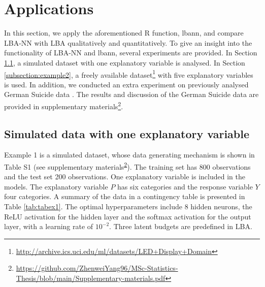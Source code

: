 \documentclass[]{interact}
\theoremstyle{plain}%
\theoremstyle{definition}
\theoremstyle{remark}
\begin{document}
\hypertarget{sec:app}{%
\section{Applications}\label{sec:app}}

In this section, we apply the aforementioned R function, \textsf{lbann},
and compare LBA-NN with LBA qualitatively and quantitatively. To give an
insight into the functionality of LBA-NN and \textsf{lbann}, several
experiments are provided. In Section \ref{subsection:example1}, a
simulated dataset with one explanatory variable is analysed. In Section
\ref{subsection:example2}, a freely available
dataset\footnote{\label{footnote:led} \url{http://archive.ics.uci.edu/ml/datasets/LED+Display+Domain}}
with five explanatory variables is used. In addition, we conducted an
extra experiment on previously analysed German Suicide data
\citep{Heijden1992}. The results and discussion of the German Suicide
data are provided in supplementary
materials\footnote{\label{footnote:suppl} \url{https://github.com/ZhenweiYang96/MSc-Statistics-Thesis/blob/main/Supplementary-materials.pdf}}.

\hypertarget{subsection:example1}{%
\subsection{Simulated data with one explanatory
variable}\label{subsection:example1}}

Example 1 is a simulated dataset, whose data generating mechanism is
shown in Table S1 (see supplementary
materials\textsuperscript{\ref{footnote:suppl}}). The training set has
800 observations and the test set 200 observations. One explanatory
variable is included in the models. The explanatory variable \(P\) has
six categories and the response variable \(Y\) four categories. A
summary of the data in a contingency table is presented in Table
\ref{tab:tabex1}. The optimal hyperparameters include 8 hidden neurons,
the ReLU activation for the hidden layer and the softmax activation for
the output layer, with a learning rate of \(10^{-2}\). Three latent
budgets are predefined in LBA.
\end{document}
